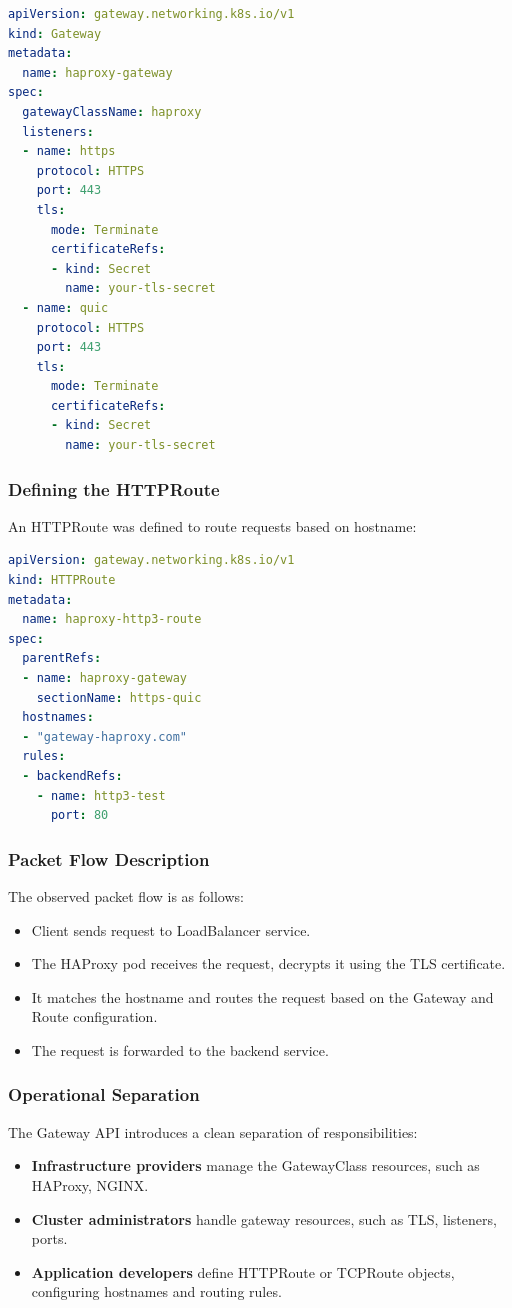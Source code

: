 \begin{lstlisting}[language=yaml]
apiVersion: gateway.networking.k8s.io/v1
kind: Gateway
metadata:
  name: haproxy-gateway
spec:
  gatewayClassName: haproxy
  listeners:
  - name: https
    protocol: HTTPS
    port: 443
    tls:
      mode: Terminate
      certificateRefs:
      - kind: Secret
        name: your-tls-secret
  - name: quic
    protocol: HTTPS
    port: 443
    tls:
      mode: Terminate
      certificateRefs:
      - kind: Secret
        name: your-tls-secret
\end{lstlisting}

\subsubsection{Defining the HTTPRoute}

An HTTPRoute was defined to route requests based on hostname:

\begin{lstlisting}[language=yaml]
apiVersion: gateway.networking.k8s.io/v1
kind: HTTPRoute
metadata:
  name: haproxy-http3-route
spec:
  parentRefs:
  - name: haproxy-gateway
    sectionName: https-quic
  hostnames:
  - "gateway-haproxy.com"
  rules:
  - backendRefs:
    - name: http3-test
      port: 80
\end{lstlisting}

\subsubsection{Packet Flow Description}

The observed packet flow is as follows:

\begin{itemize}
  \item Client sends request to LoadBalancer service.
  \item The HAProxy pod receives the request, decrypts it using the TLS certificate.
  \item It matches the hostname and routes the request based on the Gateway and Route configuration.
  \item The request is forwarded to the backend service.
\end{itemize}

\subsubsection{Operational Separation}

The Gateway API introduces a clean separation of responsibilities:
\begin{itemize}
  \item \textbf{Infrastructure providers} manage the GatewayClass resources, such as HAProxy, NGINX.
  \item \textbf{Cluster administrators} handle gateway resources, such as TLS, listeners, ports.
  \item \textbf{Application developers} define HTTPRoute or TCPRoute objects, configuring hostnames and routing rules.
\end{itemize}


